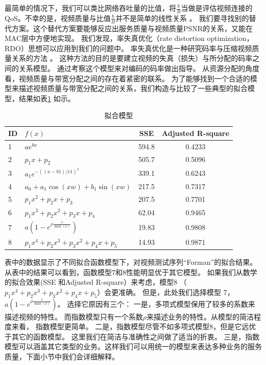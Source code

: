 \begin{enumerate}[(1)]
最简单的情况下，我们可以类比网络吞吐量的比值，将$\frac{b}{B}$当做是评估视频连接的QoS。不幸的是，视频质量与比值$\frac{b}{B}$并不是简单的线性关系
 \cite{He1013856}。
我们要寻找别的替代方案。这个替代方案要能够反应出服务质量与视频质量PSNR的关系，又能在MAC层中方便地实现。
我们发现，率失真优化（rate distortion optimization，RDO）思想可以应用到我们的问题中。
率失真优化是一种研究码率与压缩视频质量关系的方法
\cite{He1013856}\cite{E-H-Yang.TIP.2007} \cite{J-Y-Liu.ICIP.2009} 。
这种方法的目的是要建立视频的失真（损失）与所分配的码率之间的关系模型。
通过考察这个模型来对编码的码率做出指导。
从资源分配的角度看，视频质量与带宽分配之间的存在着紧密的联系。
为了能够找到一个合适的模型来描述视频质量与带宽分配之间的关系，我们构造与比较了一些典型的拟合模型，结果如表\ref{tb:chap_cacop:fit_functions} 如示。
\begin{table}[tb]
\caption{拟合模型} 
\label{tb:chap_cacop:fit_functions}
\centering
\begin{tabular}{llcc}
\toprule
ID& $f(x)$ & SSE & Adjusted R-square\\
\midrule
1&$ae^{bx}$ & 594.8 &0.4233\\
2&$p_1 x + p_2$ & 505.7 & 0.5096\\
3&$a_1e^{-((x-b1)/c1)^2}$&339.1&0.6243\\
4&$a_0 + a_1\cos(xw) + b_1\sin(xw)$&217.5&0.7317\\
5&$p_1x^2 + p_2x + p_3$ &207.5 & 0.7701\\
6&$p_1x^3 + p_2x^2 + p_3x + p_4$&62.04&0.9465\\
7&$a(1-e^{ \rho \frac{x}{\max(x)}})$ &19.83 & 0.9808\\
8&$p_1x^4 + p_2x^3 + p_3x^2 + p_4x + p_5$&14.93 &0.9871\\
\bottomrule
\end{tabular}
\end{table}
表中的数据显示了不同拟合函数模型下，对视频测试序列“Forman”的拟合结果。
从表中的结果可以看到，函数模型$7$和$8$性能明显优于其它模型。
如果我们从数学的拟合效果(SSE 和Adjusted R-square）来考虑，模型$8$ （$p_1x^4 + p_2x^3 + p_3x^2 + p_4x + p_5$）会更准确。
但是，此处我们选择模型 $7$，$a(1-e^{ \rho \frac{x}{\max(x)}})$。 
选择它原因有三个：
一是，多项式模型保用了较多的系数来描述视频的特性。
而指数模型只有一个系数$\rho$来描述业务的特性。从模型的简洁程度来看，
指数模型更简单。
二是，指数模型尽管不如多项式模型$8$，但是它远优于其它的函数模型。
这里我们在简洁与准确性之间做了适当的折衷。
三是，指数模型可以涵盖其它类型的业务。这样我们可以用统一的模型来表达多种业务的服务质量，下面小节中我们会详细解释。


\end{enumerate}
